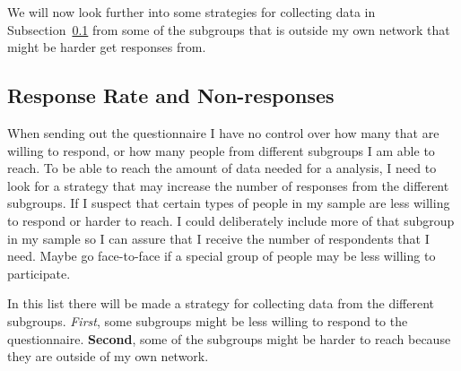 
      We will now look further into some strategies for collecting data in Subsection~\ref{sec:response} from some of the subgroups that is outside my own network that might be harder get responses from.

    \subsection{Response Rate and Non-responses} \label{sec:response}

      When sending out the questionnaire I have no control over how many that are willing to respond, or how many people from different subgroups I am able to reach. To be able to reach the amount of data needed for a analysis, I need to look for a strategy that may increase the number of responses from the different subgroups. If I suspect that certain types of people in my sample are less willing to respond or harder to reach. I could deliberately include more of that subgroup in my sample so I can assure that I receive the number of respondents that I need. Maybe go face-to-face if a special group of people may be less willing to participate. 

      In this list there will be made a strategy for collecting data from the  different subgroups. {\it First}, some subgroups might be less willing to respond to the questionnaire. {\bf Second}, some of the subgroups might be harder to reach because they are outside of my own network. 

